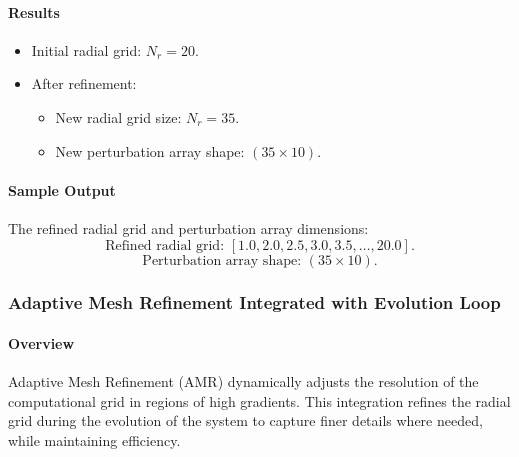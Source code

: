 \documentclass[12pt]{article}
\begin{document}
\paragraph{Results}
\begin{itemize}
    \item Initial radial grid: $N_r = 20$.
    \item After refinement:
    \begin{itemize}
        \item New radial grid size: $N_r = 35$.
        \item New perturbation array shape: $(35 \times 10)$.
    \end{itemize}
\end{itemize}

\paragraph{Sample Output}
The refined radial grid and perturbation array dimensions:
\[
\text{Refined radial grid: } [1.0, 2.0, 2.5, 3.0, 3.5, \dots, 20.0].
\]
\[
\text{Perturbation array shape: } (35 \times 10).
\]

\subsubsection{Adaptive Mesh Refinement Integrated with Evolution Loop}

\paragraph{Overview}
Adaptive Mesh Refinement (AMR) dynamically adjusts the resolution of the computational grid in regions of high gradients. This integration refines the radial grid during the evolution of the system to capture finer details where needed, while maintaining efficiency.
\end{document}
